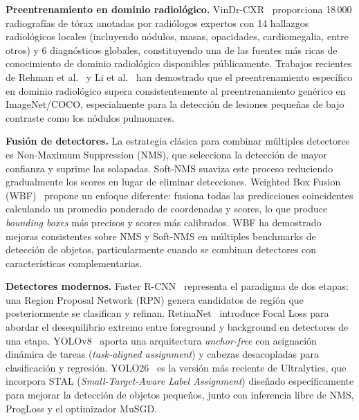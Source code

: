 \documentclass[conference]{IEEEtran}
\begin{document}
\textbf{Preentrenamiento en dominio radiol\'{o}gico.}
VinDr-CXR~\cite{vindrcxr} proporciona 18\,000 radiograf\'{i}as de t\'{o}rax
anotadas por radi\'{o}logos expertos con 14 hallazgos radiol\'{o}gicos locales
(incluyendo n\'{o}dulos, masas, opacidades, cardiomegalia, entre otros) y 6
diagn\'{o}sticos globales, constituyendo una de las fuentes m\'{a}s ricas de
conocimiento de dominio radiol\'{o}gico disponibles p\'{u}blicamente. Trabajos
recientes de Rehman et al.~\cite{rehman2024} y Li et al.~\cite{li2024} han
demostrado que el preentrenamiento espec\'{i}fico en dominio radiol\'{o}gico
supera consistentemente al preentrenamiento gen\'{e}rico en ImageNet/COCO,
especialmente para la detecci\'{o}n de lesiones peque\~{n}as de bajo contraste
como los n\'{o}dulos pulmonares.

\textbf{Fusi\'{o}n de detectores.}
La estrategia cl\'{a}sica para combinar m\'{u}ltiples detectores es
Non-Maximum Suppression (NMS), que selecciona la detecci\'{o}n de mayor
confianza y suprime las solapadas. Soft-NMS suaviza este proceso reduciendo
gradualmente los scores en lugar de eliminar detecciones. Weighted Box
Fusion (WBF)~\cite{solovyev2021} propone un enfoque diferente: fusiona todas
las predicciones coincidentes calculando un promedio ponderado de coordenadas
y scores, lo que produce \textit{bounding boxes} m\'{a}s precisos y scores
m\'{a}s calibrados. WBF ha demostrado mejoras consistentes sobre NMS y
Soft-NMS en m\'{u}ltiples benchmarks de detecci\'{o}n de objetos,
particularmente cuando se combinan detectores con caracter\'{i}sticas
complementarias.

\textbf{Detectores modernos.}
Faster R-CNN~\cite{ren2015} representa el paradigma de dos etapas: una
Region Proposal Network (RPN) genera candidatos de regi\'{o}n que
posteriormente se clasifican y refinan. RetinaNet~\cite{lin2017focal}
introduce Focal Loss para abordar el desequilibrio extremo entre foreground
y background en detectores de una etapa. YOLOv8~\cite{jocher2023} aporta una
arquitectura \textit{anchor-free} con asignaci\'{o}n din\'{a}mica de tareas
(\textit{task-aligned assignment}) y cabezas desacopladas para
clasificaci\'{o}n y regresi\'{o}n. YOLO26~\cite{yolo26} es la versi\'{o}n
m\'{a}s reciente de Ultralytics, que incorpora STAL (\textit{Small-Target-Aware
Label Assignment}) dise\~{n}ado espec\'{i}ficamente para mejorar la
detecci\'{o}n de objetos peque\~{n}os, junto con inferencia libre de NMS,
ProgLoss y el optimizador MuSGD.


\end{document}
